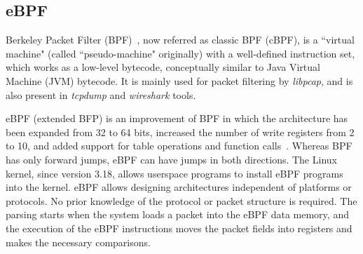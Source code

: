 \subsection{eBPF}

Berkeley Packet Filter (BPF)~\cite{McCanne:1993:BPF:1267303.1267305}, now referred as classic BPF (cBPF), is a ``virtual machine" (called ``pseudo-machine" originally) with a well-defined instruction set, which works as a low-level bytecode, conceptually similar to Java Virtual Machine (JVM) bytecode. It is mainly used for packet filtering by \textit{libpcap}, and is also present in \textit{tcpdump} and \textit{wireshark} tools.

eBPF (extended BFP) is an improvement of BPF in which the architecture has been expanded from 32 to 64 bits, increased the number of write registers from 2 to 10, and added support for table operations and function calls~\cite{eBPF}.
Whereas BPF has only forward jumps, eBPF can have jumps in both directions.
The Linux kernel, since version 3.18, allows userspace programs to install eBPF programs into the kernel. 
eBPF allows designing architectures independent of platforms or protocols.
No prior knowledge of the protocol or packet structure is required. 
The parsing starts when the system loads a packet into the eBPF data memory, and the execution of the eBPF instructions moves the packet fields into registers and makes the necessary comparisons.

